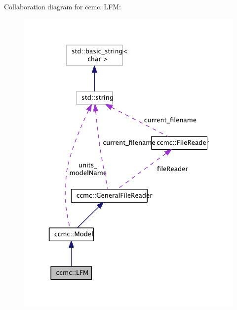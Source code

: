 Collaboration diagram for ccmc\-:\-:L\-F\-M\-:\nopagebreak
\begin{figure}[H]
\begin{center}
\leavevmode
\includegraphics[width=325pt]{classccmc_1_1_l_f_m__coll__graph}
\end{center}
\end{figure}
